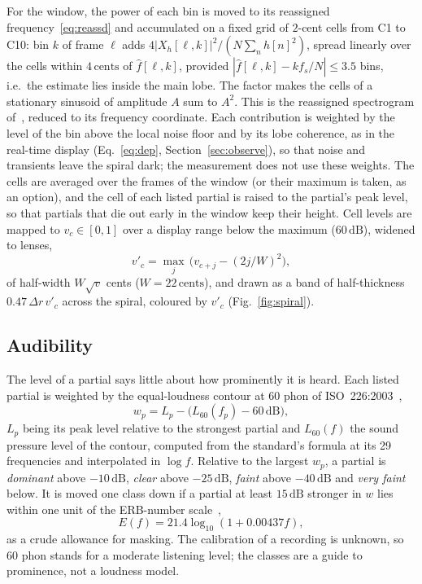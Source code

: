\documentclass[10pt,a4paper,twocolumn]{article}
\newcommand{\dB}{\,\mathrm{dB}}
\newcommand{\ct}{\,\mathrm{cents}}
\begin{document}
For the window, the power of each bin is moved to its reassigned frequency~\eqref{eq:reassd} and accumulated on a fixed grid of $2$-cent cells from C1 to C10: bin $k$ of frame $\ell$ adds $4|X_h[\ell,k]|^2/(N\sum_n h[n]^2)$, spread linearly over the cells within $4\ct$ of $\hat f[\ell,k]$, provided $|\hat f[\ell,k] - k f_s/N| \le 3.5$ bins, i.e.\ the estimate lies inside the main lobe. The factor makes the cells of a stationary sinusoid of amplitude $A$ sum to $A^2$. This is the reassigned spectrogram of~\cite{Kodera78,AugerFlandrin}, reduced to its frequency coordinate. Each contribution is weighted by the level of the bin above the local noise floor and by its lobe coherence, as in the real-time display (Eq.~\eqref{eq:dep}, Section~\ref{sec:observe}), so that noise and transients leave the spiral dark; the measurement does not use these weights. The cells are averaged over the frames of the window (or their maximum is taken, as an option), and the cell of each listed partial is raised to the partial's peak level, so that partials that die out early in the window keep their height. Cell levels are mapped to $v_c \in [0,1]$ over a display range below the maximum ($60\dB$), widened to lenses,
\begin{equation}
v'_c = \max_j\, \bigl( v_{c+j} - (2j/W)^2 \bigr),
\end{equation}
of half-width $W\sqrt{v}$ cents ($W = 22\ct$), and drawn as a band of half-thickness $0.47\,\Delta r\, v'_c$ across the spiral, coloured by $v'_c$ (Fig.~\ref{fig:spiral}).

\subsection{Audibility}

The level of a partial says little about how prominently it is heard. Each listed partial is weighted by the equal-loudness contour at $60$ phon of ISO~226:2003~\cite{ISO226},
\begin{equation}
w_p = L_p - \bigl(L_{60}(f_p) - 60\dB\bigr),
\end{equation}
$L_p$ being its peak level relative to the strongest partial and $L_{60}(f)$ the sound pressure level of the contour, computed from the standard's formula at its 29 frequencies and interpolated in $\log f$. Relative to the largest $w_p$, a partial is \emph{dominant} above $-10\dB$, \emph{clear} above $-25\dB$, \emph{faint} above $-40\dB$ and \emph{very faint} below. It is moved one class down if a partial at least $15\dB$ stronger in $w$ lies within one unit of the ERB-number scale~\cite{GlasbergMoore},
\begin{equation}
E(f) = 21.4\log_{10}(1 + 0.00437 f),
\end{equation}
as a crude allowance for masking. The calibration of a recording is unknown, so $60$ phon stands for a moderate listening level; the classes are a guide to prominence, not a loudness model.
\end{document}
